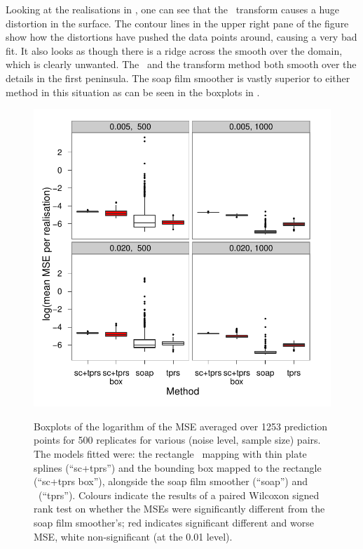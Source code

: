 Looking at the realisations in , one can see that the \sch\ transform causes a huge distortion in the surface. The contour lines in the upper right pane of the figure show how the distortions have pushed the data points around, causing a very bad fit. It also looks as though there is a ridge across the smooth over the domain, which is clearly unwanted. The \tprs\ and the transform method both smooth over the details in the first peninsula. The soap film smoother is vastly superior to either method in this situation as can be seen in the boxplots in .

\begin{figure}[p]
\centering
\includegraphics[width=6in]{sc/tablecode/wt2-boxplot.pdf} \\
\caption{Boxplots of the logarithm of the MSE averaged over 1253 prediction points for 500 replicates for various (noise level, sample size) pairs. The models fitted were: the rectangle \sch\ mapping with thin plate splines (``sc+tprs'') and the bounding box mapped to the rectangle (``sc+tprs box''), alongside the soap film smoother (``soap'') and \tprs\ (``tprs''). Colours indicate the results of a paired Wilcoxon signed rank test on whether the MSEs were significantly different from the soap film smoother's; red indicates significant different and worse MSE, white non-significant (at the 0.01 level).}
\label{wigglytop2-boxplots}
\end{figure}

